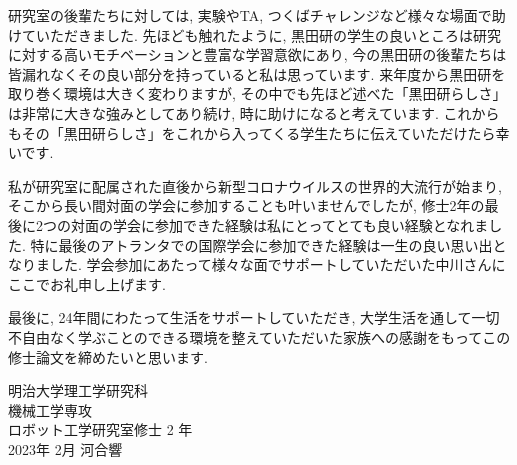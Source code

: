 研究室の後輩たちに対しては, 実験やTA, つくばチャレンジなど様々な場面で助けていただきました. 先ほども触れたように, 黒田研の学生の良いところは研究に対する高いモチベーションと豊富な学習意欲にあり, 今の黒田研の後輩たちは皆漏れなくその良い部分を持っていると私は思っています. 来年度から黒田研を取り巻く環境は大きく変わりますが, その中でも先ほど述べた「黒田研らしさ」は非常に大きな強みとしてあり続け, 時に助けになると考えています. これからもその「黒田研らしさ」をこれから入ってくる学生たちに伝えていただけたら幸いです.\par
私が研究室に配属された直後から新型コロナウイルスの世界的大流行が始まり, そこから長い間対面の学会に参加することも叶いませんでしたが, 修士2年の最後に2つの対面の学会に参加できた経験は私にとってとても良い経験となれました. 特に最後のアトランタでの国際学会に参加できた経験は一生の良い思い出となりました. 学会参加にあたって様々な面でサポートしていただいた中川さんにここでお礼申し上げます.\par
最後に, 24年間にわたって生活をサポートしていただき, 大学生活を通して一切不自由なく学ぶことのできる環境を整えていただいた家族への感謝をもってこの修士論文を締めたいと思います.


\begin{flushright}
    明治大学理工学研究科 \\
    機械工学専攻 \\
    ロボット工学研究室修士 2 年 \\
    2023年 2月 河合響 \\
\end{flushright}
